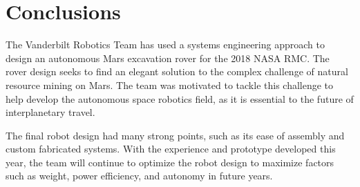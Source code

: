 \documentclass[class=article, crop=false]{standalone}
\begin{document}
	\section{Conclusions}
		The Vanderbilt Robotics Team has used a systems engineering approach to design an autonomous Mars excavation rover for the 2018 NASA RMC. The rover design seeks to find an elegant solution to the complex challenge of natural resource mining on Mars. The team was motivated to tackle this challenge to help develop the autonomous space robotics field, as it is essential to the future of interplanetary travel. 
		
		
The final robot design had many strong points, such as its ease of assembly and custom fabricated systems. With the experience and prototype developed this year, the team will continue to optimize the robot design to maximize factors such as weight, power efficiency, and autonomy in future years.
\end{document}
